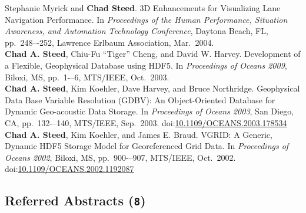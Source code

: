 \documentclass[11pt, letterpaper]{article}
\newcommand{\years}[1]{\marginnote{\scriptsize #1}}
\begin{document}
\begin{sloppypar}
\years{2004}Stephanie Myrick and \textbf{Chad Steed}.  3D Enhancements for
Visualizing Lane Navigation Performance.  In \emph{Proceedings of the Human
Performance, Situation Awareness, and Automation Technology Conference},
Daytona Beach, FL, pp.\ 248–-252, Lawrence Erlbaum Association, Mar.\ 2004.\\
\years{2003}\textbf{Chad A. Steed}, Chiu-Fu ``Tiger'' Cheng, and David W.
Harvey.  Development of a Flexible, Geophysical Database using HDF5.  In
\emph{Proceedings of Oceans 2009}, Biloxi, MS, pp.\ 1-–6, MTS/IEEE, Oct.\ 2003.\\
\years{2003}\textbf{Chad A. Steed}, Kim Koehler, Dave Harvey, and Bruce
Northridge.  Geophysical Data Base Variable Resolution (GDBV): An
Object-Oriented Database for Dynamic Geo-acoustic Data Storage.  In
\emph{Proceedings of Oceans 2003}, San Diego, CA, pp.\ 132-–140, MTS/IEEE,
Sep.\ 2003. doi:\href{http://dx.doi.org/10.1109/OCEANS.2003.178534}
{10.1109/OCEANS.2003.178534}\\
\years{2002}\textbf{Chad A. Steed}, Kim Koehler, and James E. Braud.
VGRID: A Generic, Dynamic HDF5 Storage Model for Georeferenced Grid Data.
In \emph{Proceedings of Oceans 2002}, Biloxi, MS, pp.\ 900-–907,
MTS/IEEE, Oct.\ 2002. doi:\href{http://dx.doi.org/10.1109/OCEANS.2002.1192087}
{10.1109/OCEANS.2002.1192087}
\end{sloppypar}

\subsection*{Referred Abstracts (\texttt{8})}
\end{document}
